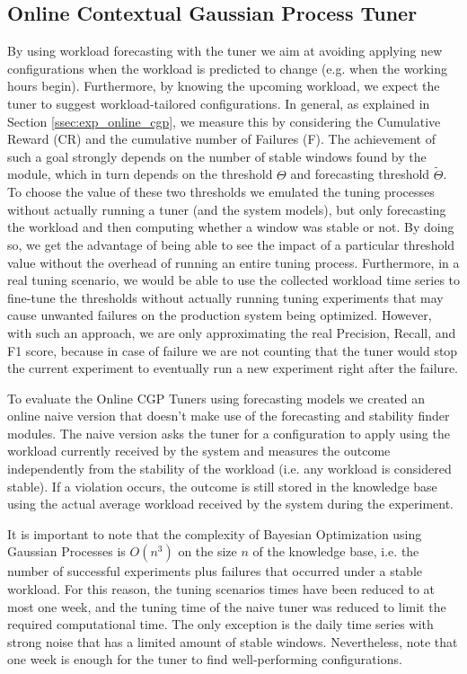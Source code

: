 \documentclass[a4paper, 12pt]{article} %
\begin{document}
	\clearpage
	\subsection{Online Contextual Gaussian Process Tuner} \label{ssec:results_online_cgp_tuner}
	By using workload forecasting with the tuner we aim at avoiding applying new configurations when the workload is predicted to change (e.g. when the working hours begin). Furthermore, by knowing the upcoming workload, we expect the tuner to suggest workload-tailored configurations. In general, as explained in Section \ref{ssec:exp_online_cgp}, we measure this by considering the Cumulative Reward (CR) and the cumulative number of Failures (F).
	The achievement of such a goal strongly depends on the number of stable windows found by the module, which in turn depends on the threshold $\Theta$ and forecasting threshold $\tilde{\Theta}$. To choose the value of these two thresholds we emulated the tuning processes without actually running a tuner (and the system models), but only forecasting the workload and then computing whether a window was stable or not. By doing so, we get the advantage of being able to see the impact of a particular threshold value without the overhead of running an entire tuning process. Furthermore, in a real tuning scenario, we would be able to use the collected workload time series to fine-tune the thresholds without actually running tuning experiments that may cause unwanted failures on the production system being optimized. However, with such an approach, we are only approximating the real Precision, Recall, and F1 score, because in case of failure we are not counting that the tuner would stop the current experiment to eventually run a new experiment right after the failure.
	
	To evaluate the Online CGP Tuners using forecasting models we created an online naive version that doesn't make use of the forecasting and stability finder modules. The naive version asks the tuner for a configuration to apply using the workload currently received by the system and measures the outcome independently from the stability of the workload (i.e. any workload is considered stable). If a violation occurs, the outcome is still stored in the knowledge base using the actual average workload received by the system during the experiment.
	
	It is important to note that the complexity of Bayesian Optimization using Gaussian Processes is $O(n^3)$ on the size $n$ of the knowledge base, i.e. the number of successful experiments plus failures that occurred under a stable workload. For this reason, the tuning scenarios times have been reduced to at most one week, and the tuning time of the naive tuner was reduced to limit the required computational time. The only exception is the daily time series with strong noise that has a limited amount of stable windows. Nevertheless, note that one week is enough for the tuner to find well-performing configurations. 
	
\end{document}
